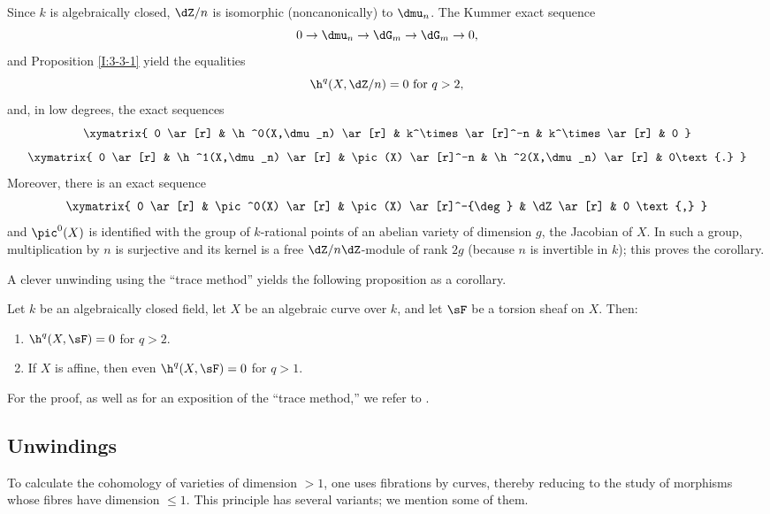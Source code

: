 \documentclass[oneside]{book}
\begin{document}
Since $k$ is algebraically closed, $\dZ/n$ is isomorphic
(noncanonically) to $\dmu_n$. The Kummer exact sequence
\[
  0 \to \dmu_n \to \dG_m \to \dG_m \to 0\text{,}
\]
and Proposition \ref{I:3-3-1} yield the equalities
\[
  \h^q(X,\dZ/n) = 0 \text{ for $q>2$,}
\]
and, in low degrees, the exact sequences
\[\xymatrix{
  0 \ar[r]
    & \h^0(X,\dmu_n) \ar[r]
    & k^\times \ar[r]^-n
    & k^\times \ar[r]
    & 0
}\]
\[\xymatrix{
  0 \ar[r]
    & \h^1(X,\dmu_n) \ar[r]
    & \pic(X) \ar[r]^-n
    & \h^2(X,\dmu_n) \ar[r]
    & 0\text{.}
}\]
Moreover, there is an exact sequence
\[\xymatrix{
  0 \ar[r]
    & \pic^0(X) \ar[r]
    & \pic(X) \ar[r]^-{\deg}
    & \dZ \ar[r]
    & 0 \text{,}
}\]
and $\pic^0(X)$ is identified with the group of $k$-rational points of
an abelian variety of dimension $g$, the Jacobian of $X$. In such a
group, multiplication by $n$ is surjective and its kernel is a free
$\dZ/n\dZ$-module of rank $2g$ (because $n$ is invertible in $k$);
this proves the corollary.

A clever unwinding using the “trace method” yields the following
proposition as a corollary.

\begin{proposition}\label{I:3-3-6}
Let $k$ be an algebraically closed field, let $X$ be an algebraic curve
over $k$, and let $\sF$ be a torsion sheaf on $X$. Then:
\begin{enumerate}[\indent i)]
  \item $\h^q(X,\sF)=0$ for $q>2$.
  \item If $X$ is affine, then even $\h^q(X,\sF)=0$ for $q>1$.
\end{enumerate}
\end{proposition}

For the proof, as well as for an exposition of the “trace method,” we
refer to \cite[IX 5]{sga4}.

\subsection{Unwindings}\label{I:3-4}

To calculate the cohomology of varieties of dimension $>1$, one uses
fibrations by curves, thereby reducing to the study of morphisms whose
fibres have dimension $\leqslant1$. This principle has several variants;
we mention some of them.

\subsubsection{}\label{I:3-4-1}
\end{document}
